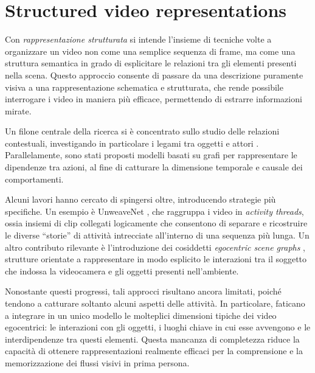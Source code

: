 \section{Structured video representations}

Con \emph{rappresentazione strutturata} si intende l'insieme di tecniche volte a organizzare un video non come una semplice sequenza di frame, ma come una struttura semantica in grado di esplicitare le relazioni tra gli elementi presenti nella scena. Questo approccio consente di passare da una descrizione puramente visiva a una rappresentazione schematica e strutturata, che rende possibile interrogare i video in maniera più efficace, permettendo di estrarre informazioni mirate.

Un filone centrale della ricerca si è concentrato sullo studio delle relazioni contestuali, investigando in particolare i legami tra oggetti e attori \cite{arnab2021unifiedgraphstructuredmodels, baradel2018objectlevelvisualreasoning, cong2021spatialtemporaltransformerdynamicscene, jain2016structuralrnndeeplearningspatiotemporal, ji2019actiongenomeactionscomposition, ma2018attendinteracthigherorderobject, sun2018actorcentricrelationnetwork, wang2018videosspacetimeregiongraphs}. Parallelamente, sono stati proposti modelli basati su grafi per rappresentare le dipendenze tra azioni, al fine di catturare la dimensione temporale e causale dei comportamenti.

Alcuni lavori hanno cercato di spingersi oltre, introducendo strategie più specifiche. Un esempio è UnweaveNet \cite{price2022unweavenetunweavingactivitystories}, che raggruppa i video in \emph{activity threads}, ossia insiemi di clip collegati logicamente che consentono di separare e ricostruire le diverse “storie” di attività intrecciate all'interno di una sequenza più lunga. Un altro contributo rilevante è l'introduzione dei cosiddetti \emph{egocentric scene graphs} \cite{rodin2023actionscenegraphslongform}, strutture orientate a rappresentare in modo esplicito le interazioni tra il soggetto che indossa la videocamera e gli oggetti presenti nell'ambiente.

Nonostante questi progressi, tali approcci risultano ancora limitati, poiché tendono a catturare soltanto alcuni aspetti delle attività. In particolare, faticano a integrare in un unico modello le molteplici dimensioni tipiche dei video egocentrici: le interazioni con gli oggetti, i luoghi chiave in cui esse avvengono e le interdipendenze tra questi elementi. Questa mancanza di completezza riduce la capacità di ottenere rappresentazioni realmente efficaci per la comprensione e la memorizzazione dei flussi visivi in prima persona.


